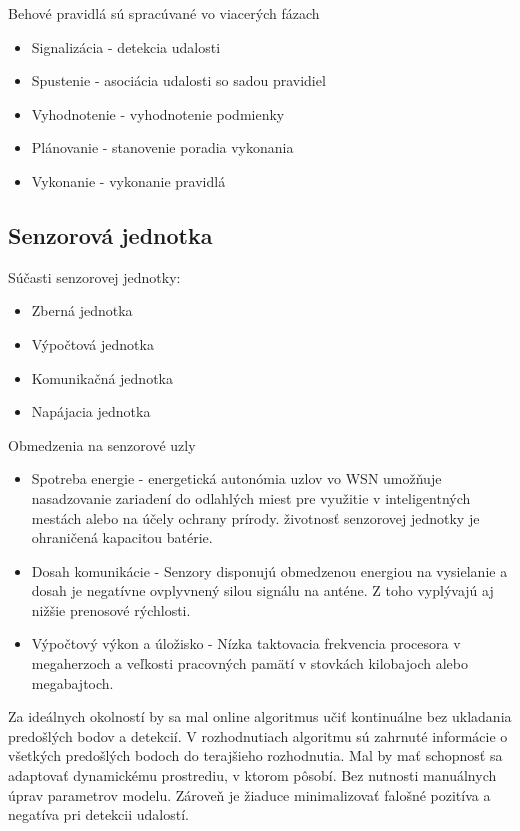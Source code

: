 Behové pravidlá sú spracúvané vo viacerých fázach
\begin{itemize}
\item Signalizácia - detekcia udalosti
\item Spustenie - asociácia udalosti so sadou pravidiel
\item Vyhodnotenie - vyhodnotenie podmienky
\item Plánovanie - stanovenie poradia vykonania
\item Vykonanie - vykonanie pravidlá
\end{itemize}
\cite{processing-information-flows}

\subsection{Senzorová jednotka}

Súčasti senzorovej jednotky:
\begin{itemize}
\item Zberná jednotka
\item Výpočtová jednotka
\item Komunikačná jednotka
\item Napájacia jednotka
\end{itemize}

Obmedzenia na senzorové uzly 
\begin{itemize}
\item Spotreba energie - energetická autonómia uzlov vo WSN umožňuje nasadzovanie zariadení do odlahlých miest pre využitie v inteligentných mestách alebo na účely ochrany prírody. životnosť senzorovej jednotky je ohraničená kapacitou batérie.
\item Dosah komunikácie - Senzory disponujú obmedzenou energiou na vysielanie a dosah je negatívne ovplyvnený silou signálu na anténe. Z toho vyplývajú aj nižšie prenosové rýchlosti.
\item Výpočtový výkon a úložisko - Nízka taktovacia frekvencia procesora v megaherzoch a veľkosti pracovných pamätí v stovkách kilobajoch alebo megabajtoch.
\end{itemize}
\cite{big-data-collection-wsn}


Za ideálnych okolností by sa mal online algoritmus učiť kontinuálne bez ukladania predošlých bodov a detekcií.
V rozhodnutiach algoritmu sú zahrnuté informácie o všetkých predošlých bodoch do terajšieho rozhodnutia. Mal by mať schopnosť sa adaptovať dynamickému prostrediu, v ktorom pôsobí. Bez nutnosti manuálnych úprav parametrov modelu. Zároveň je žiaduce minimalizovať falošné pozitíva a negatíva pri detekcii udalostí.

